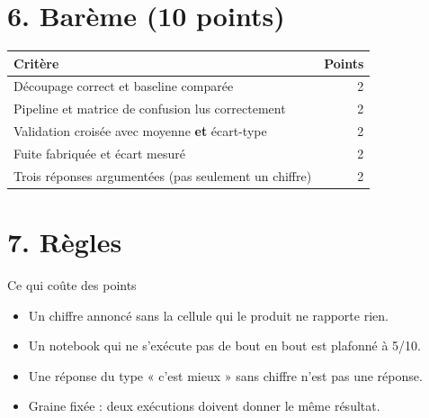 \documentclass[10.5pt,a4paper]{article}
\begin{document}
\section*{\color{bleu}6. Barème (10 points)}

\small
\begin{tabular}{@{}>{\raggedright\arraybackslash}p{}r@{}}
\toprule
\textbf{Critère} & \textbf{Points}\\
\midrule
Découpage correct et baseline comparée & 2\\
Pipeline et matrice de confusion lus correctement & 2\\
Validation croisée avec moyenne \textbf{et} écart-type & 2\\
Fuite fabriquée et écart mesuré & 2\\
Trois réponses argumentées (pas seulement un chiffre) & 2\\
\bottomrule
\end{tabular}
\normalsize

\section*{\color{bleu}7. Règles}

\begin{attn}{Ce qui coûte des points}
\begin{itemize}
  \item Un chiffre annoncé sans la cellule qui le produit ne rapporte rien.
  \item Un notebook qui ne s'exécute pas de bout en bout est plafonné à 5/10.
  \item Une réponse du type « c'est mieux » sans chiffre n'est pas une réponse.
  \item Graine fixée : deux exécutions doivent donner le même résultat.
\end{itemize}
\end{attn}
\end{document}
